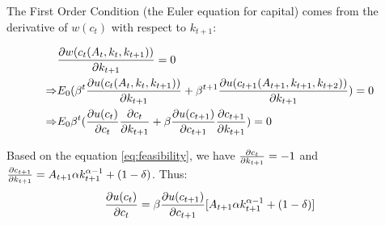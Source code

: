 \documentclass[a4paper,12pt]{article}
\begin{document}
The First Order Condition (the Euler equation for capital) comes 
from the derivative of $w(c_t)$ with respect to $k_{t+1}$:


\begin{align}
    & \pdv{{w(c_t(A_t, k_t, k_{t+1}))}}{k_{t+1}} = 0 \\
    \Rightarrow & E_0 (\beta^t \pdv{u(c_t(A_t, k_t, k_{t+1}))}{k_{t+1}} 
    + \beta^{t+1} \pdv{u(c_{t+1}(A_{t+1}, k_{t+1}, k_{t+2}))}{k_{t+1}}) = 0\\
    \Rightarrow & E_0 \beta^t (\pdv{u(c_t)}{c_t} \pdv{c_t}{k_{t+1}} + 
    \beta \pdv{u(c_{t+1})}{c_{t+1}}\pdv{c_{t+1}}{k_{t+1}}) = 0 
\end{align}

Based on the equation \eqref{eq:feasibility}, we have 
$\pdv{c_t}{k_{t+1}} = -1$ and $\pdv{c_{t+1}}{k_{t+1}} = 
A_{t+1} \alpha k_{t+1}^{\alpha - 1} + (1 - \delta)$. Thus: 
\begin{align} \label{FOC_final}
    \pdv{u(c_t)}{c_t} = 
    \beta \pdv{u(c_{t+1})}{c_{t+1}} [A_{t+1} \alpha k_{t+1}^{\alpha - 1} + (1 - \delta)] 
\end{align}



\end{document}
